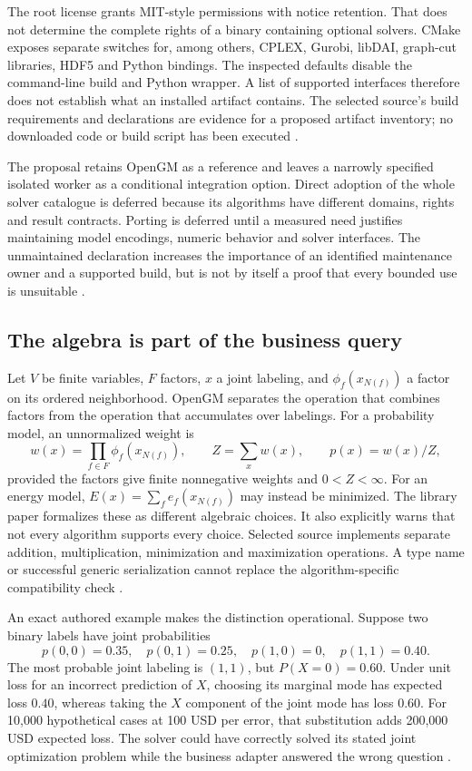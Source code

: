 The root license grants MIT-style permissions with notice retention. That
does not determine the complete rights of a binary containing optional
solvers. CMake exposes separate switches for, among others, CPLEX, Gurobi,
libDAI, graph-cut libraries, HDF5 and Python bindings. The inspected defaults
disable the command-line build and Python wrapper. A list of supported
interfaces therefore does not establish what an installed artifact contains.
The selected source's build requirements and declarations are evidence for
a proposed artifact inventory; no downloaded code or build script has been
executed \citep{exec24_opengm_source}.

The proposal retains OpenGM as a reference and leaves a narrowly specified
isolated worker as a conditional integration option. Direct adoption of the
whole solver catalogue is deferred because its algorithms have different
domains, rights and result contracts. Porting is deferred until a measured
need justifies maintaining model encodings, numeric behavior and solver
interfaces. The unmaintained declaration increases the importance of an
identified maintenance owner and a supported build, but is not by itself a
proof that every bounded use is unsuitable \citep{exec24_opengm_choice}.

\subsection{The algebra is part of the business query}
Let $V$ be finite variables, $F$ factors, $x$ a joint labeling, and
$\phi_f(x_{N(f)})$ a factor on its ordered neighborhood. OpenGM separates
the operation that combines factors from the operation that accumulates
over labelings. For a probability model, an unnormalized weight is
\[
 w(x)=\prod_{f\in F}\phi_f(x_{N(f)}),\qquad
 Z=\sum_x w(x),\qquad p(x)=w(x)/Z,
\]
provided the factors give finite nonnegative weights and $0<Z<\infty$.
For an energy model, $E(x)=\sum_f e_f(x_{N(f)})$ may instead be minimized.
The library paper formalizes these as different algebraic choices. It also
explicitly warns that not every algorithm supports every choice. Selected
source implements separate addition, multiplication, minimization and
maximization operations. A type name or successful generic serialization
cannot replace the algorithm-specific compatibility check
\citep{exec24_opengm_paper,exec24_opengm_source}.

An exact authored example makes the distinction operational. Suppose two
binary labels have joint probabilities
\[
 p(0,0)=0.35,\quad p(0,1)=0.25,\quad p(1,0)=0,\quad p(1,1)=0.40.
\]
The most probable joint labeling is $(1,1)$, but $P(X=0)=0.60$. Under
unit loss for an incorrect prediction of $X$, choosing its marginal mode
has expected loss $0.40$, whereas taking the $X$ component of the joint
mode has loss $0.60$. For 10,000 hypothetical cases at 100 USD per error,
that substitution adds 200,000 USD expected loss. The solver could have
correctly solved its stated joint optimization problem while the business
adapter answered the wrong question \citep{exec24_opengm_choice}.

